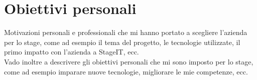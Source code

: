 \section{Obiettivi personali}
\label{sez:obiettivi-personali}

Motivazioni personali e professionali che mi hanno portato a scegliere l'azienda per lo stage, come ad esempio il tema del progetto, le tecnologie utilizzate, 
il primo impatto con l'azienda a StageIT, ecc.\\
Vado inoltre a descrivere gli obiettivi personali che mi sono imposto per lo stage, come ad esempio imparare nuove tecnologie, migliorare le mie competenze, ecc.